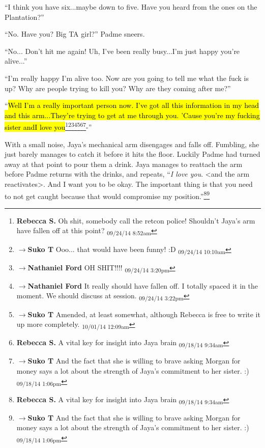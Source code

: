 ``I think you have six...maybe down to five.  Have you heard from the ones on the Plantation?''

``No.  Have you?  Big TA girl?'' Padme sneers.

``No... Don't hit me again!  Uh, I've been really busy...I'm just happy you're alive...''

``I'm really happy I'm alive too.  Now are you going to tell me what the fuck is up? Why are people trying to kill you?  Why are they coming after me?''

``\hl{Well I'm a really important person now.  I've got all this information in my head and this arm...They're trying to get at me through you.  'Cause you're my fucking sister and}\hl{I love you}\footnote{\textbf{Rebecca S. }Oh shit, somebody call the retcon police! Shouldn't Jaya's arm have fallen off at this point? \textsubscript{09/24/14 8:52am}}\footnote{$\rightarrow$\textbf{Suko T }Ooo... that would have been funny! :D \textsubscript{09/24/14 10:10am}}\footnote{$\rightarrow$\textbf{Nathaniel Ford }OH SHIT!!!! \textsubscript{09/24/14 3:20pm}}\footnote{$\rightarrow$\textbf{Nathaniel Ford }It really should have fallen off. I totally spaced it in the moment. We should discuss at session. \textsubscript{09/24/14 3:22pm}}\footnote{$\rightarrow$\textbf{Suko T }Amended, at least somewhat, although Rebecca is free to write it up more completely. \textsubscript{10/01/14 12:09am}}\footnote{\textbf{Rebecca S. }A vital key for insight into Jaya brain \textsubscript{09/18/14 9:34am}}\footnote{$\rightarrow$\textbf{Suko T }And the fact that she is willing to brave asking Morgan for money says a lot about the strength of Jaya's commitment to her sister. :) \textsubscript{09/18/14 1:06pm}}-''

With a small noise, Jaya's mechanical arm disengages and falls off.  Fumbling, she just barely manages to catch it before it hits the floor.  Luckily Padme had turned away at that point to pour them a drink.  Jaya manages to reattach the arm before Padme returns with the drinks, and repeats,  ``\textit{I love you}. \textless and the arm reactivates\textgreater .  And I want you to be okay.  The important thing is that you need to not get caught because that would compromise my position.''\footnote{\textbf{Rebecca S. }A vital key for insight into Jaya brain \textsubscript{09/18/14 9:34am}}\footnote{$\rightarrow$\textbf{Suko T }And the fact that she is willing to brave asking Morgan for money says a lot about the strength of Jaya's commitment to her sister. :) \textsubscript{09/18/14 1:06pm}}

